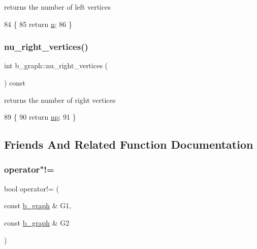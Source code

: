 returns the number of left vertices 


\begin{DoxyCode}
84 \{
85   \textcolor{keywordflow}{return} \hyperlink{classb__graph_a9e211d40c1799bc9b125de472ff06642}{n};
86 \}
\end{DoxyCode}
\mbox{\label{classb__graph_abecfd7d6fbd0d9a554fe0d9aa3241a04}} 
\subsubsection{\texorpdfstring{nu\+\_\+right\+\_\+vertices()}{nu\_right\_vertices()}}
{\footnotesize\ttfamily int b\+\_\+graph\+::nu\+\_\+right\+\_\+vertices (\begin{DoxyParamCaption}{ }\end{DoxyParamCaption}) const}



returns the number of right vertices 


\begin{DoxyCode}
89 \{
90   \textcolor{keywordflow}{return} \hyperlink{classb__graph_acffdd5f20329515eb6ec17ad24f1ca64}{np};
91 \}
\end{DoxyCode}


\subsection{Friends And Related Function Documentation}
\mbox{\label{classb__graph_ab90cd92a2e8f077e4ae18c568bcddd1a}} 
\subsubsection{\texorpdfstring{operator"!=}{operator!=}}
{\footnotesize\ttfamily bool operator!= (\begin{DoxyParamCaption}\item[{const \hyperlink{classb__graph}{b\+\_\+graph} \&}]{G1,  }\item[{const \hyperlink{classb__graph}{b\+\_\+graph} \&}]{G2 }\end{DoxyParamCaption})\hspace{0.3cm}{\ttfamily [friend]}}



